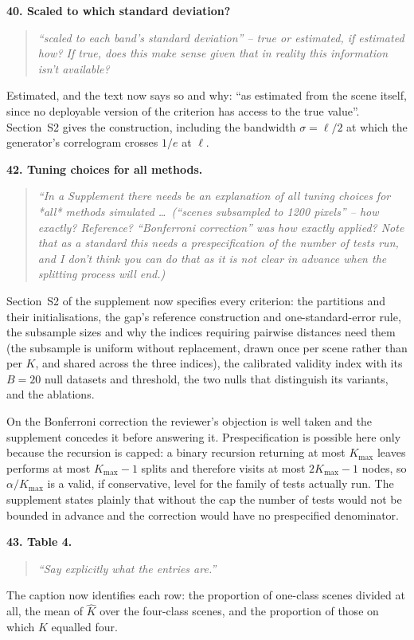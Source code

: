 \documentclass[11pt]{article}
\newcommand{\R}[1]{\medskip\noindent\textbf{#1}\quad}
\newenvironment{rquote}{\begin{quote}\itshape}{\end{quote}}
\begin{document}
\R{40. Scaled to which standard deviation?}
\begin{rquote}
``scaled to each band's standard deviation'' -- true or estimated, if
estimated how? If true, does this make sense given that in reality this
information isn't available?
\end{rquote}
Estimated, and the text now says so and why: ``as estimated from the scene
itself, since no deployable version of the criterion has access to the true
value''. Section~S2 gives the construction, including the bandwidth
$\sigma=\ell/2$ at which the generator's correlogram crosses $1/e$ at $\ell$.

\R{42. Tuning choices for all methods.}
\begin{rquote}
``In a Supplement there needs be an explanation of all tuning choices for
*all* methods simulated \dots\ (``scenes subsampled to 1200 pixels'' -- how
exactly? Reference? ``Bonferroni correction'' was how exactly applied? Note
that as a standard this needs a prespecification of the number of tests run,
and I don't think you can do that as it is not clear in advance when the
splitting process will end.)
\end{rquote}
Section~S2 of the supplement now specifies every criterion: the partitions and
their initialisations, the gap's reference construction and one-standard-error
rule, the subsample sizes and why the indices requiring pairwise distances need
them (the subsample is uniform without replacement, drawn once per scene rather
than per $K$, and shared across the three indices), the calibrated validity
index with its $B=20$ null datasets and threshold, the two nulls that
distinguish its variants, and the ablations.

On the Bonferroni correction the reviewer's objection is well taken and the
supplement concedes it before answering it. Prespecification is possible here
only because the recursion is capped: a binary recursion returning at most
$K_{\max}$ leaves performs at most $K_{\max}-1$ splits and therefore visits at
most $2K_{\max}-1$ nodes, so $\alpha/K_{\max}$ is a valid, if conservative,
level for the family of tests actually run. The supplement states plainly that
without the cap the number of tests would not be bounded in advance and the
correction would have no prespecified denominator.

\R{43. Table 4.}
\begin{rquote}
``Say explicitly what the entries are.''
\end{rquote}
The caption now identifies each row: the proportion of one-class scenes divided
at all, the mean of $\hat K$ over the four-class scenes, and the proportion of
those on which $\hat K$ equalled four.
\end{document}
